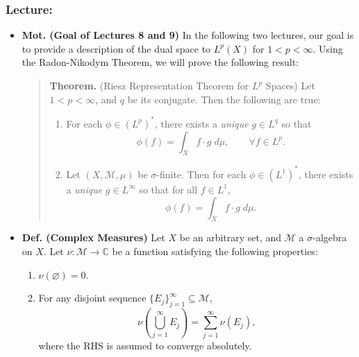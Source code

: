 \documentclass{article}
\begin{document}
\subsubsection{Lecture:}
\begin{itemize}
	\item \textbf{Mot. (Goal of Lectures 8 and 9)} In the following two lectures, our goal is to provide a description of the dual space to $L^{p}(X)$ for $1 < p < \infty$. Using the Radon-Nikodym Theorem, we will prove the following result: 
		\begin{quote}
			\textbf{Theorem.} (Riesz Representation Theorem for $L^{p}$ Spaces) Let $1 < p < \infty$, and $q$ be its conjugate. Then the following are true: \vspace{-0.15cm}
			\begin{enumerate}[itemsep =-2pt,label = (\roman{*})]
				\item For each $\phi \in (L^{p})^{\ast}$, there exists a \textit{unique} $g \in L^{q}$ so that 
					\begin{equation*}
						\phi(f) = \int_{X}f \cdot g\;d\mu, \qquad \forall f\in L^{p}. 
					\end{equation*}
				\item Let $(X, \mathscr{M},\mu)$ be $\sigma$-finite. Then for each $\phi \in (L^{1})^{\ast}$, there exists a \textit{unique} $g \in L^{\infty}$ so that for all $f \in L^{1}$, 
					\begin{equation*}
						\phi(f) = \int_{X} f \cdot g\;d\mu. 
					\end{equation*}
			\end{enumerate}
		\end{quote}
	\item \textbf{Def. (Complex Measures)} Let $X$ be an arbitrary set, and $\mathscr{M}$ a $\sigma$-algebra on $X$. Let $\nu: \mathscr{M} \to \mathbb{C}$ be a function satisfying the following properties: \vspace{-0.15cm}
	\begin{enumerate}[itemsep =-2pt,label = (\arabic{*})]
		\item $\nu(\varnothing) = 0$. 
		\item For any disjoint sequence $\{E_{j}\}_{j = 1}^{\infty} \subseteq \mathscr{M}$, 
			\begin{equation}
				\nu\left(\bigcup_{j = 1}^{\infty}E_{j}\right) = \sum_{j = 1}^{\infty}\nu(E_{j}),
			\end{equation}
		where the RHS is assumed to converge absolutely. 
	\end{enumerate}

\end{itemize}
\end{document}
